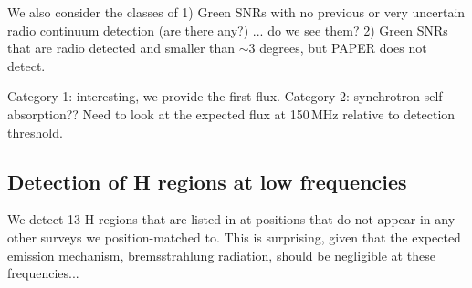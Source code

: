 \documentclass[useAMS,usenatbib]{mn2e}
\begin{document}
We also consider the classes of 1) Green SNRs with no previous or very
uncertain radio continuum detection (are there any?) ... do we see
them?  2) Green SNRs that are radio detected and smaller than $\sim3$
degrees, but PAPER does not detect.

Category 1: interesting, we provide the first flux.  Category 2:
synchrotron self-absorption??  Need to look at the expected flux at
150\,MHz relative to detection threshold.  

\subsection{Detection of {H} regions at low frequencies}
We detect 13 {H} regions that are listed in \cite{Paladini.03} at positions that do not appear in any other surveys we position-matched to. This is surprising, given that the expected emission mechanism, bremsstrahlung radiation, should be negligible at these frequencies...
\end{document}

